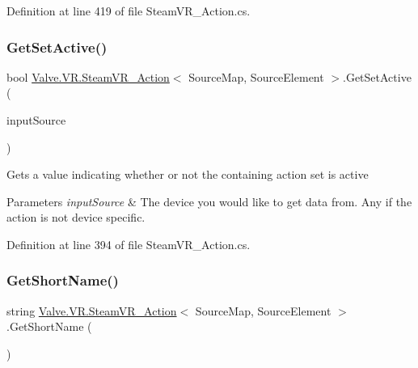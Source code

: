 Definition at line 419 of file Steam\+V\+R\+\_\+\+Action.\+cs.

\mbox{\label{class_valve_1_1_v_r_1_1_steam_v_r___action_a78c588d2687e397766adb5f004e3597d}} 
\subsubsection{\texorpdfstring{GetSetActive()}{GetSetActive()}}
{\footnotesize\ttfamily bool \mbox{\hyperlink{class_valve_1_1_v_r_1_1_steam_v_r___action}{Valve.\+V\+R.\+Steam\+V\+R\+\_\+\+Action}}$<$ Source\+Map, Source\+Element $>$.Get\+Set\+Active (\begin{DoxyParamCaption}\item[{\mbox{\hyperlink{namespace_valve_1_1_v_r_a82e5bf501cc3aa155444ee3f0662853f}{Steam\+V\+R\+\_\+\+Input\+\_\+\+Sources}}}]{input\+Source }\end{DoxyParamCaption})}



Gets a value indicating whether or not the containing action set is active 


\begin{DoxyParams}{Parameters}
{\em input\+Source} & The device you would like to get data from. Any if the action is not device specific.\\
\hline
\end{DoxyParams}


Definition at line 394 of file Steam\+V\+R\+\_\+\+Action.\+cs.

\mbox{\label{class_valve_1_1_v_r_1_1_steam_v_r___action_a94911ac96600a93ce23790166435b593}} 
\subsubsection{\texorpdfstring{GetShortName()}{GetShortName()}}
{\footnotesize\ttfamily string \mbox{\hyperlink{class_valve_1_1_v_r_1_1_steam_v_r___action}{Valve.\+V\+R.\+Steam\+V\+R\+\_\+\+Action}}$<$ Source\+Map, Source\+Element $>$.Get\+Short\+Name (\begin{DoxyParamCaption}{ }\end{DoxyParamCaption})}



